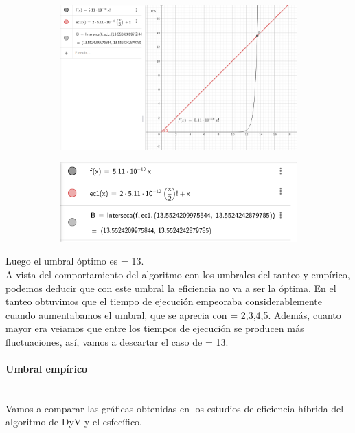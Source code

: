 \documentclass{article}
\newcommand{\myparagraph}[1]{\paragraph{#1}\mbox{}\\}
\begin{document}
    \begin{figure}[H]
        \begin{subfigure}{0.4\textwidth}
            \centering
            \includegraphics[width=0.9\linewidth]{P3/Geogebra/geogebra_analiatica4.png}
        \end{subfigure} \hfill
        \begin{subfigure}{0.4\textwidth}
            \centering
            \includegraphics[width=0.9\linewidth]{P3/Geogebra/Analitico_Geogebra.png}
        \end{subfigure}
    \end{figure}
    
    Luego el umbral óptimo es  = 13. \\

    A vista del comportamiento del algoritmo con los umbrales del tanteo y empírico, podemos deducir que con este umbral la eficiencia no va a ser la óptima. En el tanteo obtuvimos que el tiempo de ejecución empeoraba considerablemente cuando aumentabamos el umbral, que se aprecia con  = 2,3,4,5. Además, cuanto mayor era  veiamos que entre los tiempos de ejecución se producen más fluctuaciones, así, vamos a descartar el caso de  = 13. 
    
\myparagraph{Umbral empírico}
    Vamos a comparar las gráficas obtenidas en los estudios de eficiencia híbrida del algoritmo de DyV y el esfecífico. 
\end{document}
